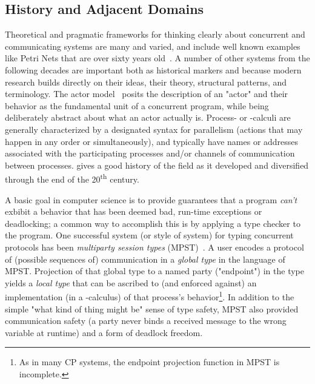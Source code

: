\subsection{History and Adjacent Domains}
\label{sec:history}

Theoretical and pragmatic frameworks for thinking clearly about concurrent and communicating systems are many and varied,
and include well known examples like Petri Nets that are over sixty years old~\cite{Petri1962}.
A number of other systems from the following decades are important both as historical markers and because modern research
builds directly on their ideas, their theory, structural patterns, and terminology.
The actor model~\cite{hewitt_actor_model} posits the description of an "actor" and their behavior as the fundamental
unit of a concurrent program, while being deliberately abstract about what an actor actually is.
Process- or \textpi-calculi are generally characterized by a designated syntax for parallelism
(actions that may happen in any order or simultaneously),
and typically have names or addresses associated with the participating processes and/or channels of communication between processes.
\cite{baeten2004} gives a good history of the field as it developed and diversified through the end of the 20\textsuperscript{th} century.

A basic goal in computer science is to provide guarantees that a program \emph{can't} exbibit a behavior that has been deemed bad,
\eg run-time exceptions or deadlocking;
a common way to accomplish this is by applying a type checker to the program.
One successful system (or style of system) for typing concurrent protocols has been \emph{multiparty session types} (MPST)~\cite{honda-mpsts}.
A user encodes a protocol of (possible sequences of) communication in a \emph{global type} in the language of MPST.
Projection of that global type to a named party ("endpoint") in the type yields a \emph{local type}
that can be ascribed to (and enforced against) an implementation (\eg in a \textpi-calculus) of that process's behavior\footnote{
	As in many CP systems, the endpoint projection function in MPST is incomplete.
}.
In addition to the simple "what kind of thing might  be" sense of type safety,
MPST also provided communication safety (\eg a party never binds a received message to the wrong variable at runtime)
and a form of deadlock freedom.

